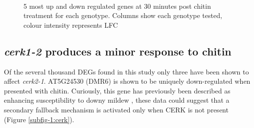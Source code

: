 \documentclass[../main.tex]{subfiles}
\begin{document}
\begin{figure}[!ht]
  \centering
  \\
  \caption{5 most up and down regulated genes at 30 minutes post chitin
    treatment for each genotype. Columns show each genotype tested, colour intensity represents LFC}
  \label{fig:DEG5}
\end{figure}


\subsection{\textit{cerk1-2} produces a minor response to chitin}

Of the several thousand DEGs found in this study only three have been shown to
affect \textit{cerk2-1}. AT5G24530 (DMR6) is shown to be uniquely down-regulated when
presented with chitin. Curiously, this gene has previously been described as
enhancing susceptibility to downy mildew \cite{DOWNYMILDEWRESISTANT}, these data
could suggest that a secondary fallback mechanism is activated only when CERK is
not present (Figure \ref{subfig-1:cerk}).
\end{document}
